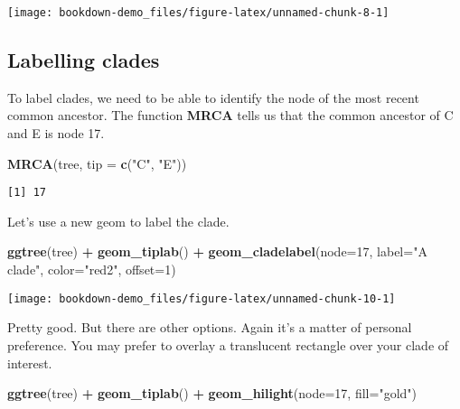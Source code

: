 \documentclass[]{book}
\newenvironment{Shaded}{\begin{snugshade}}{\end{snugshade}}
\newcommand{\KeywordTok}[1]{\textcolor[rgb]{0.13,0.29,0.53}{\textbf{#1}}}
\newcommand{\DataTypeTok}[1]{\textcolor[rgb]{0.13,0.29,0.53}{#1}}
\newcommand{\DecValTok}[1]{\textcolor[rgb]{0.00,0.00,0.81}{#1}}
\newcommand{\StringTok}[1]{\textcolor[rgb]{0.31,0.60,0.02}{#1}}
\newcommand{\OperatorTok}[1]{\textcolor[rgb]{0.81,0.36,0.00}{\textbf{#1}}}
\newcommand{\NormalTok}[1]{#1}
\begin{document}
\begin{center}\texttt{[image: bookdown-demo\_files/figure-latex/unnamed-chunk-8-1]} \end{center}

\subsection{Labelling clades}\label{labelling-clades}

To label clades, we need to be able to identify the node of the most
recent common ancestor. The function \textbf{MRCA} tells us that the
common ancestor of C and E is node 17.

\begin{Shaded}
\begin{Highlighting}[]
\KeywordTok{MRCA}\NormalTok{(tree, }\DataTypeTok{tip =} \KeywordTok{c}\NormalTok{(}\StringTok{"C"}\NormalTok{, }\StringTok{"E"}\NormalTok{))}
\end{Highlighting}
\end{Shaded}

\begin{verbatim}
[1] 17
\end{verbatim}

Let's use a new geom to label the clade.

\begin{Shaded}
\begin{Highlighting}[]
\KeywordTok{ggtree}\NormalTok{(tree) }\OperatorTok{+}\StringTok{ }
\StringTok{  }\KeywordTok{geom_tiplab}\NormalTok{() }\OperatorTok{+}\StringTok{ }
\StringTok{  }\KeywordTok{geom_cladelabel}\NormalTok{(}\DataTypeTok{node=}\DecValTok{17}\NormalTok{, }
                  \DataTypeTok{label=}\StringTok{"A clade"}\NormalTok{, }
                  \DataTypeTok{color=}\StringTok{"red2"}\NormalTok{, }
                  \DataTypeTok{offset=}\DecValTok{1}\NormalTok{)}
\end{Highlighting}
\end{Shaded}

\begin{center}\texttt{[image: bookdown-demo\_files/figure-latex/unnamed-chunk-10-1]} \end{center}

Pretty good. But there are other options. Again it's a matter of
personal preference. You may prefer to overlay a translucent rectangle
over your clade of interest.

\begin{Shaded}
\begin{Highlighting}[]
\KeywordTok{ggtree}\NormalTok{(tree) }\OperatorTok{+}\StringTok{ }
\StringTok{  }\KeywordTok{geom_tiplab}\NormalTok{() }\OperatorTok{+}\StringTok{ }
\StringTok{  }\KeywordTok{geom_hilight}\NormalTok{(}\DataTypeTok{node=}\DecValTok{17}\NormalTok{, }\DataTypeTok{fill=}\StringTok{"gold"}\NormalTok{)}
\end{Highlighting}
\end{Shaded}
\end{document}

